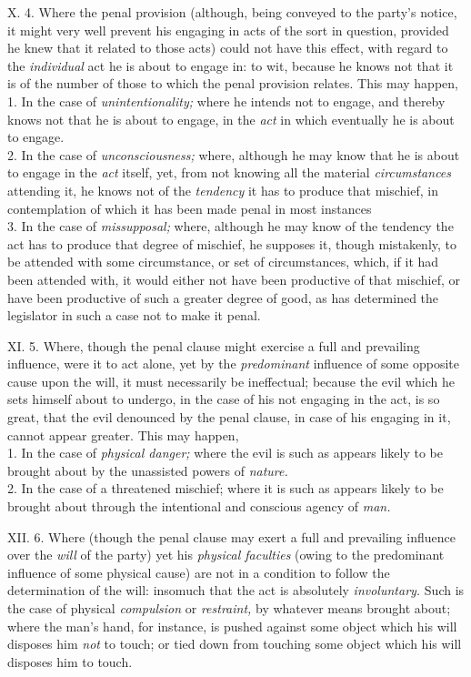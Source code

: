 \documentclass[12pt]{report}
\begin{document}
X. 4. Where the penal provision (although, being conveyed to the party's
notice, it might very well prevent his engaging in acts of the sort in
question, provided he knew that it related to those acts) could not have
this effect, with regard to the \emph{individual} act he is about to
engage in: to wit, because he knows not that it is of the number of
those to which the penal provision relates. This may happen,\\
1. In the case of \emph{unintentionality;} where he intends not to
engage, and thereby knows not that he is about to engage, in the
\emph{act} in which eventually he is about to engage.\\
2. In the case of \emph{unconsciousness;} where, although he may know
that he is about to engage in the \emph{act} itself, yet, from not
knowing all the material \emph{circumstances} attending it, he knows not
of the \emph{tendency} it has to produce that mischief, in contemplation
of which it has been made penal in most instances\\
3. In the case of \emph{missupposal;} where, although he may know of the
tendency the act has to produce that degree of mischief, he supposes it,
though mistakenly, to be attended with some circumstance, or set of
circumstances, which, if it had been attended with, it would either not
have been productive of that mischief, or have been productive of such a
greater degree of good, as has determined the legislator in such a case
not to make it penal.

XI. 5. Where, though the penal clause might exercise a full and
prevailing influence, were it to act alone, yet by the
\emph{predominant} influence of some opposite cause upon the will, it
must necessarily be ineffectual; because the evil which he sets himself
about to undergo, in the case of his not engaging in the act, is so
great, that the evil denounced by the penal clause, in case of his
engaging in it, cannot appear greater. This may happen,\\
1. In the case of \emph{physical danger;} where the evil is such as
appears likely to be brought about by the unassisted powers of
\emph{nature.}\\
2. In the case of a threatened mischief; where it is such as appears
likely to be brought about through the intentional and conscious agency
of \emph{man.}

XII. 6. Where (though the penal clause may exert a full and prevailing
influence over the \emph{will} of the party) yet his \emph{physical
faculties} (owing to the predominant influence of some physical cause)
are not in a condition to follow the determination of the will: insomuch
that the act is absolutely \emph{involuntary.} Such is the case of
physical \emph{compulsion} or \emph{restraint,} by whatever means
brought about; where the man's hand, for instance, is pushed against
some object which his will disposes him \emph{not} to touch; or tied
down from touching some object which his will disposes him to touch.
\end{document}
